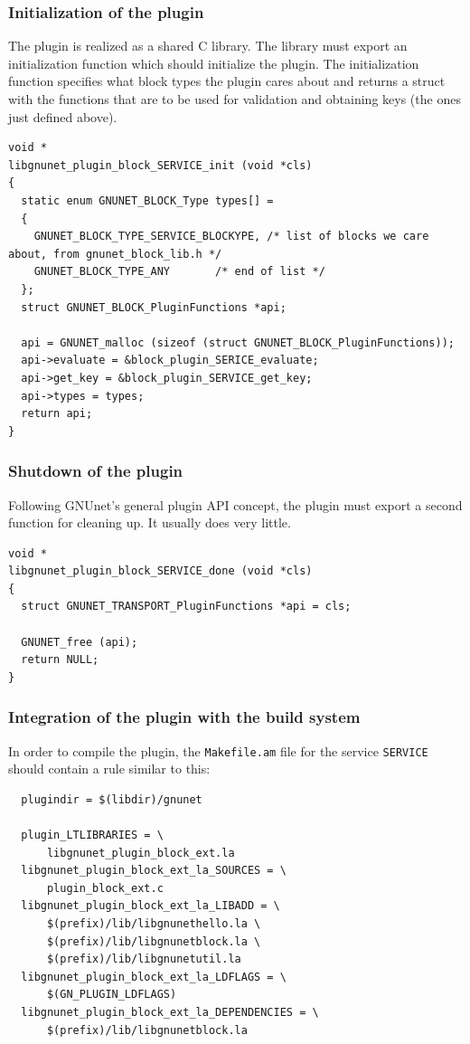 \documentclass[10pt]{article}
\begin{document}
\subsubsection{Initialization of the plugin}

The plugin is realized as a shared C library.  The library must export
an initialization function which should initialize the plugin.  The
initialization function specifies what block types the plugin cares
about and returns a struct with the functions that are to be used for
validation and obtaining keys (the ones just defined above).

\lstset{language=C}
\begin{lstlisting}
void *
libgnunet_plugin_block_SERVICE_init (void *cls)
{
  static enum GNUNET_BLOCK_Type types[] =
  {
    GNUNET_BLOCK_TYPE_SERVICE_BLOCKYPE, /* list of blocks we care about, from gnunet_block_lib.h */
    GNUNET_BLOCK_TYPE_ANY       /* end of list */
  };
  struct GNUNET_BLOCK_PluginFunctions *api;

  api = GNUNET_malloc (sizeof (struct GNUNET_BLOCK_PluginFunctions));
  api->evaluate = &block_plugin_SERICE_evaluate;
  api->get_key = &block_plugin_SERVICE_get_key;
  api->types = types;
  return api;
}
\end{lstlisting}

\subsubsection{Shutdown of the plugin}

Following GNUnet's general plugin API concept, the plugin must
export a second function for cleaning up.  It usually does very
little.

\lstset{language=C}
\begin{lstlisting}
void *
libgnunet_plugin_block_SERVICE_done (void *cls)
{
  struct GNUNET_TRANSPORT_PluginFunctions *api = cls;

  GNUNET_free (api);
  return NULL;
}
\end{lstlisting}


\subsubsection{Integration of the plugin with the build system}

In order to compile the plugin, the {\tt Makefile.am} file for the
service \texttt{SERVICE} should contain a rule similar to this:

\lstset{language=make}
\begin{lstlisting}
  plugindir = $(libdir)/gnunet

  plugin_LTLIBRARIES = \
	  libgnunet_plugin_block_ext.la
  libgnunet_plugin_block_ext_la_SOURCES = \
	  plugin_block_ext.c
  libgnunet_plugin_block_ext_la_LIBADD = \
	  $(prefix)/lib/libgnunethello.la \
	  $(prefix)/lib/libgnunetblock.la \
	  $(prefix)/lib/libgnunetutil.la
  libgnunet_plugin_block_ext_la_LDFLAGS = \
	  $(GN_PLUGIN_LDFLAGS)
  libgnunet_plugin_block_ext_la_DEPENDENCIES = \
	  $(prefix)/lib/libgnunetblock.la
\end{lstlisting}
\end{document}
